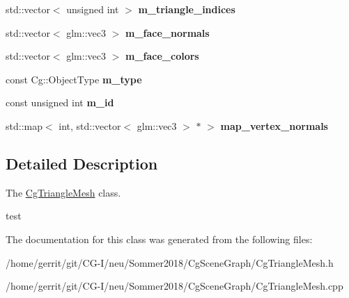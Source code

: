 \begin{DoxyCompactItemize}
\mbox{\label{class_cg_triangle_mesh_a895c65499c2af00187ce2744a0a869b5}} 
std\+::vector$<$ unsigned int $>$ {\bfseries m\+\_\+triangle\+\_\+indices}
\item 
\mbox{\label{class_cg_triangle_mesh_a2c1a214fee088747335020035cac20a8}} 
std\+::vector$<$ glm\+::vec3 $>$ {\bfseries m\+\_\+face\+\_\+normals}
\item 
\mbox{\label{class_cg_triangle_mesh_ac5bf9fc12ed64cf8809f2fd5acf0e8d7}} 
std\+::vector$<$ glm\+::vec3 $>$ {\bfseries m\+\_\+face\+\_\+colors}
\item 
\mbox{\label{class_cg_triangle_mesh_a671745f7fc0f95889d2214ed2b37ba61}} 
const Cg\+::\+Object\+Type {\bfseries m\+\_\+type}
\item 
\mbox{\label{class_cg_triangle_mesh_a6cf3537caed7c8d13410548068705759}} 
const unsigned int {\bfseries m\+\_\+id}
\item 
\mbox{\label{class_cg_triangle_mesh_aafd95f8840b7c2b32d5eabff932f5bfc}} 
std\+::map$<$ int, std\+::vector$<$ glm\+::vec3 $>$ $\ast$ $>$ {\bfseries map\+\_\+vertex\+\_\+normals}
\end{DoxyCompactItemize}


\subsection{Detailed Description}
The \hyperlink{class_cg_triangle_mesh}{Cg\+Triangle\+Mesh} class. 

test 

The documentation for this class was generated from the following files\+:\begin{DoxyCompactItemize}
\item 
/home/gerrit/git/\+C\+G-\/\+I/neu/\+Sommer2018/\+Cg\+Scene\+Graph/Cg\+Triangle\+Mesh.\+h\item 
/home/gerrit/git/\+C\+G-\/\+I/neu/\+Sommer2018/\+Cg\+Scene\+Graph/Cg\+Triangle\+Mesh.\+cpp\end{DoxyCompactItemize}
